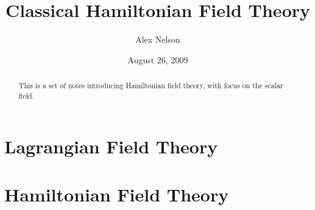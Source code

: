 \documentclass{amsart}
\title{Classical Hamiltonian Field Theory}
\date{August 26, 2009}
\author{Alex Nelson}
\numberwithin{equation}{section}
\begin{document}
\begin{abstract}
This is a set of notes introducing Hamiltonian field theory, with
focus on the scalar field.
\end{abstract}
\maketitle
\tableofcontents

\section{Lagrangian Field Theory}

\section{Hamiltonian Field Theory}


\nocite{*}


\end{document}
